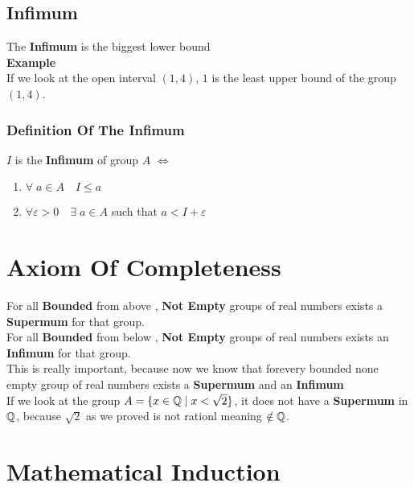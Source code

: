 \subsection{Infimum}
The \textbf{Infimum} is the biggest lower bound\\
\textbf{Example}\\
If we look at the open interval $(1,4)$, $1$ is the least upper bound of the group $(1,4)$.\\
\subsubsection{Definition Of The Infimum}
$I$ is the \textbf{Infimum} of group $A$ $\iff$ 
\begin{enumerate}
    \item $\forall \; a\in A \quad I\leq a$
    \item $\forall \varepsilon>0\quad \exists\; a\in A$ such that $a<I+\varepsilon$
\end{enumerate}

\section{Axiom Of Completeness}
For all \textbf{Bounded} from above , \textbf{Not Empty} groups of real numbers exists a \textbf{Supermum} for that group.\\
For all \textbf{Bounded} from below , \textbf{Not Empty} groups of real numbers exists an \textbf{Infimum} for that group.\\
This is really important, because now we know that forevery bounded none empty group of real numbers exists a \textbf{Supermum} and an \textbf{Infimum}\\
If we look at the group $A = \{x\in \mathbb{Q}\; | \; x<\sqrt{2}\}$, it does not have a \textbf{Supermum} in $\mathbb{Q}$, because $\sqrt{2}$ as we proved is not rationl meaning $\notin \mathbb{Q}$.\\

\newpage

\section{Mathematical Induction}
